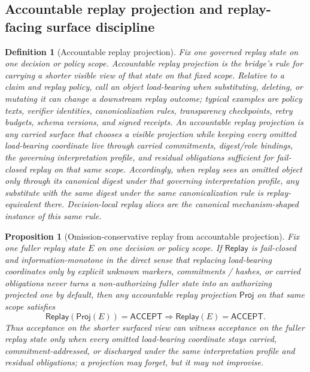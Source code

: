 \documentclass[11pt]{article}
\newtheorem{definition}{Definition}
\newtheorem{proposition}{Proposition}
\newcommand{\Acc}{\mathsf{ACCEPT}}
\newcommand{\Proj}{\mathsf{Proj}}
\newcommand{\Replay}{\mathsf{Replay}}
\begin{document}
\subsection*{Accountable replay projection and replay-facing surface discipline}

\begin{definition}[Accountable replay projection]
Fix one governed replay state on one decision or policy scope.
Accountable replay projection is the bridge's rule for carrying a shorter visible view of that state on that fixed scope.
Relative to a claim and replay policy, call an object \emph{load-bearing} when substituting, deleting, or mutating it can change a downstream replay outcome; typical examples are policy texts, verifier identities, canonicalization rules, transparency checkpoints, retry budgets, schema versions, and signed receipts.
An accountable replay projection is any carried surface that chooses a visible projection while keeping every omitted load-bearing coordinate live through carried commitments, digest/role bindings, the governing interpretation profile, and residual obligations sufficient for fail-closed replay on that same scope.
Accordingly, when replay sees an omitted object only through its canonical digest under that governing interpretation profile, any substitute with the same digest under the same canonicalization rule is replay-equivalent there.
Decision-local replay slices are the canonical mechanism-shaped instance of this same rule.
\end{definition}

\begin{proposition}[Omission-conservative replay from accountable projection]
Fix one fuller replay state $E$ on one decision or policy scope.
If $\Replay$ is fail-closed and information-monotone in the direct sense that replacing load-bearing coordinates only by explicit unknown markers, commitments / hashes, or carried obligations never turns a non-authorizing fuller state into an authorizing projected one by default, then any accountable replay projection $\Proj$ on that same scope satisfies
\[
\Replay(\Proj(E)) = \Acc \Longrightarrow \Replay(E)=\Acc.
\]
Thus acceptance on the shorter surfaced view can witness acceptance on the fuller replay state only when every omitted load-bearing coordinate stays carried, commitment-addressed, or discharged under the same interpretation profile and residual obligations; a projection may forget, but it may not \emph{improvise}.
\end{proposition}
\end{document}
